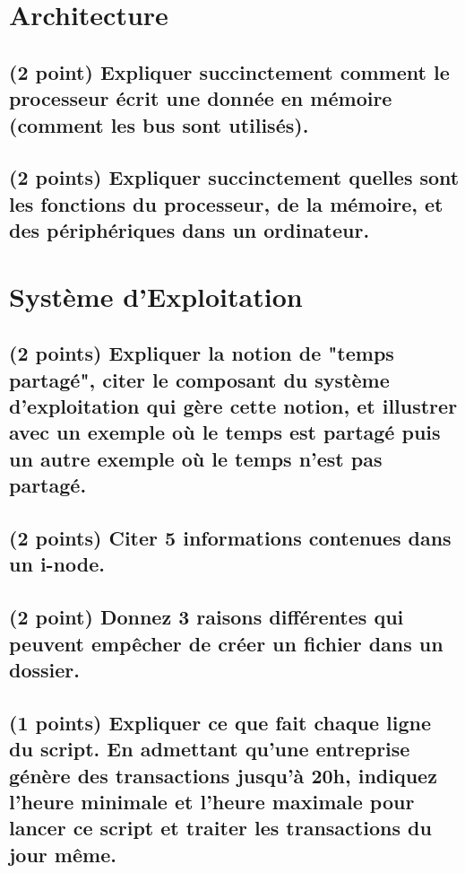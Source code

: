 \documentclass[11pt,a4paper]{article}
\begin{document}
\section{Architecture} %

\subsection{(2 point) Expliquer succinctement comment le processeur écrit une donnée en mémoire (comment les bus sont utilisés).}

\bigskip

\subsection{(2 points) Expliquer succinctement quelles sont les fonctions du processeur, de la mémoire, et des périphériques dans un ordinateur.}

\bigskip
\bigskip
\bigskip

\section{Système d'Exploitation} %

\subsection{(2 points) Expliquer la notion de "temps partagé", citer le composant du système d'exploitation qui gère cette notion, et illustrer avec un exemple où le temps est partagé puis un autre exemple où le temps n'est pas partagé.}

\bigskip

\subsection{(2 points) Citer 5 informations contenues dans un i-node.}

\bigskip

\subsection{(2 point) Donnez 3 raisons différentes qui peuvent empêcher de créer un fichier dans un dossier.}

\bigskip

\pagebreak

\subsection{(1 points) Expliquer ce que fait chaque ligne du script. En admettant qu'une entreprise génère des transactions jusqu'à 20h, indiquez l'heure minimale et l'heure maximale pour lancer ce script et traiter les transactions du jour même.}
\end{document}
